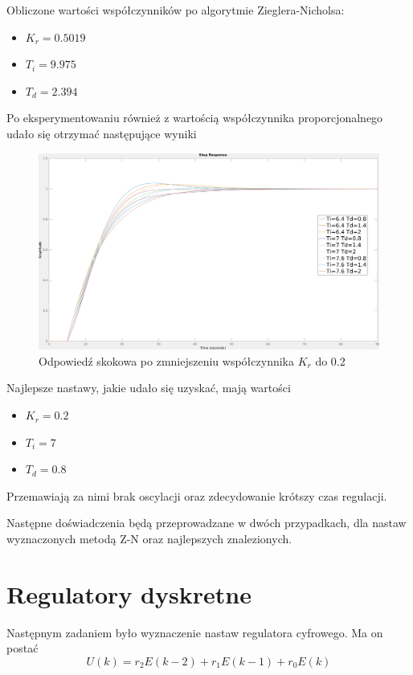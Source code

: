 \documentclass[fleqn]{article}
\begin{document}
Obliczone wartości współczynników po algorytmie Zieglera-Nicholsa:
\begin{itemize}
	\item $K_r = 0.5019$
	\item $T_i = 9.975$
	\item $T_d = 2.394$
\end{itemize}
\pagebreak
Po eksperymentowaniu również z wartością współczynnika proporcjonalnego udało się otrzymać następujące wyniki

\begin{figure}[H]
	\includegraphics[width=\textwidth]{scripts/odpowiedzskokM.png}
	\caption{Odpowiedź skokowa po zmniejszeniu współczynnika $K_r$ do 0.2}
\end{figure}

Najlepsze nastawy, jakie udało się uzyskać, mają wartości
\begin{itemize}
	\item $K_r = 0.2$
	\item $T_i = 7$
	\item $T_d = 0.8$
\end{itemize}

Przemawiają za nimi brak oscylacji oraz zdecydowanie krótszy czas regulacji.

Następne doświadczenia będą przeprowadzane w dwóch przypadkach, dla nastaw wyznaczonych metodą Z-N oraz najlepszych znalezionych.

\section{Regulatory dyskretne}

Następnym zadaniem było wyznaczenie nastaw regulatora cyfrowego. Ma on postać
{\Large
\begin{equation}
	U(k)=r_2E(k-2)+r_1E(k-1)+r_0E(k)
\end{equation}
}
\end{document}
